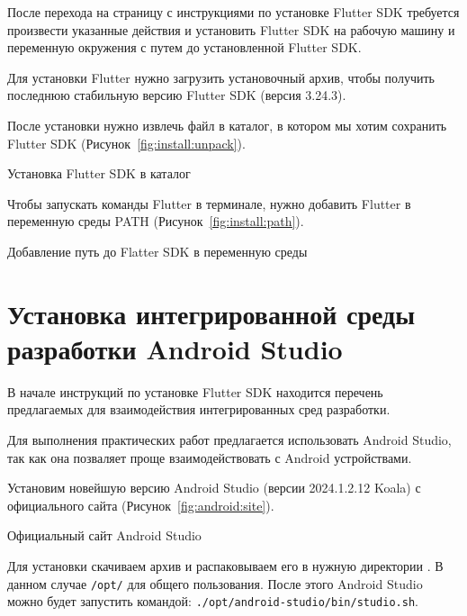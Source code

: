 После перехода на страницу с инструкциями по установке
Flutter SDK требуется произвести указанные действия
и установить Flutter SDK на рабочую машину
и переменную окружения с путем до установленной Flutter SDK.\par
Для установки Flutter нужно загрузить установочный архив,
чтобы получить последнюю стабильную версию Flutter SDK (версия 3.24.3).\par
После установки нужно извлечь файл в каталог,
в котором мы хотим сохранить Flutter SDK (Рисунок~\ref{fig:install:unpack}).

\begin{image}
	\caption{Установка Flutter SDK в каталог}
	\label{fig:install:unpack}
\end{image}

Чтобы запускать команды Flutter в терминале,
нужно добавить Flutter в переменную среды PATH
(Рисунок~\ref{fig:install:path}).

\begin{image}
	\caption{Добавление путь до Flatter SDK в переменную среды}
	\label{fig:install:path}
\end{image}

\section{Установка интегрированной среды разработки Android Studio}

В начале инструкций по установке Flutter SDK находится перечень предлагаемых
для взаимодействия интегрированных сред разработки.\par
Для выполнения практических работ предлагается использовать Android Studio,
так как она позваляет проще взаимодействовать с Android устройствами.\par

Установим новейшую версию Android Studio (версии 2024.1.2.12 Koala)
с официального сайта (Рисунок~\ref{fig:android:site}).

\begin{image}
	\caption{Официальный сайт Android Studio}
	\label{fig:android:site}
\end{image}

Для установки скачиваем архив и распаковываем его в нужную директории
.
В данном случае \texttt{/opt/} для общего пользования.
После этого Android Studio можно будет запустить командой:
\texttt{./opt/android-studio/bin/studio.sh}.

